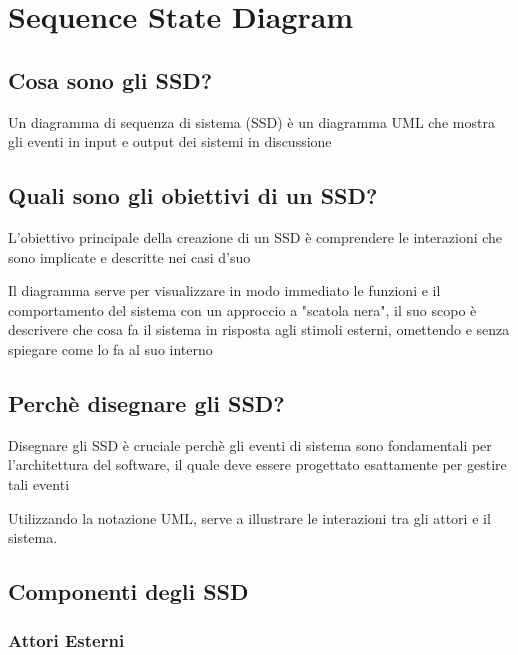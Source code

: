 \section{Sequence State Diagram}

\subsection{Cosa sono gli SSD?}
Un diagramma di sequenza di sistema (SSD) è un diagramma UML che mostra gli eventi in input e output dei sistemi in discussione
\subsection{Quali sono gli obiettivi di un SSD?}
L'obiettivo principale della creazione di un SSD è comprendere le interazioni che sono implicate e descritte nei casi d'suo

\vspace{\baselineskip}

Il diagramma serve per visualizzare in modo immediato le funzioni e il comportamento del sistema con un approccio a "scatola nera", il suo scopo è descrivere che cosa fa il sistema in risposta agli stimoli esterni, omettendo e senza spiegare come lo fa al suo interno
\subsection{Perchè disegnare gli SSD?}
Disegnare gli SSD è cruciale perchè gli eventi di sistema sono fondamentali per l'architettura del software, il quale deve essere progettato esattamente per gestire tali eventi

\vspace{1\baselineskip} \noindent

Utilizzando la notazione UML, serve a illustrare le interazioni tra gli attori e il sistema.

\subsection{Componenti degli SSD}

\subsubsection{Attori Esterni}
\begin{center}
\end{center}

